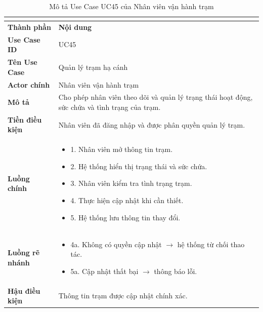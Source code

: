 \begin{longtable}{|C{3cm}|L{11cm}|}
\caption{Mô tả Use Case UC45 của Nhân viên vận hành trạm}\\
\label{tab:mo-ta-uc45-van-hanh-tram}\\
\hline
\textbf{Thành phần} & \textbf{Nội dung} \\
\hline
\textbf{Use Case ID} & UC45 \\
\hline
\textbf{Tên Use Case} & Quản lý trạm hạ cánh \\
\hline
\textbf{Actor chính} & Nhân viên vận hành trạm \\
\hline
\textbf{Mô tả} &
Cho phép nhân viên theo dõi và quản lý trạng thái hoạt động, sức chứa và tình trạng của trạm.
\\
\hline
\textbf{Tiền điều kiện} &
Nhân viên đã đăng nhập và được phân quyền quản lý trạm.
\\
\hline
\textbf{Luồng chính} &
\begin{itemize}[leftmargin=*,topsep=2pt,itemsep=2pt]
    \item 1. Nhân viên mở thông tin trạm.
    \item 2. Hệ thống hiển thị trạng thái và sức chứa.
    \item 3. Nhân viên kiểm tra tình trạng trạm.
    \item 4. Thực hiện cập nhật khi cần thiết.
    \item 5. Hệ thống lưu thông tin thay đổi.
\end{itemize}
\\
\hline
\textbf{Luồng rẽ nhánh} &
\begin{itemize}[leftmargin=*,topsep=2pt,itemsep=2pt]
    \item 4a. Không có quyền cập nhật $\rightarrow$ hệ thống từ chối thao tác.
    \item 5a. Cập nhật thất bại $\rightarrow$ thông báo lỗi.
\end{itemize}
\\
\hline
\textbf{Hậu điều kiện} &
Thông tin trạm được cập nhật chính xác.
\\
\hline
\end{longtable}


